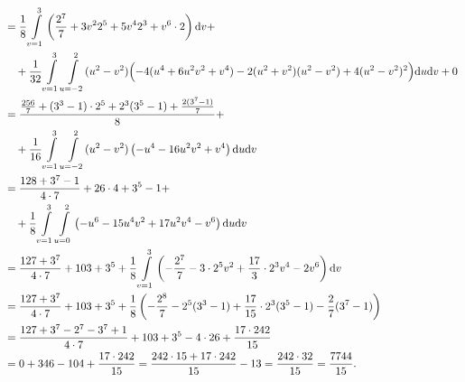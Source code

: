 {\begin{align*}
&=\frac 1{8}\int\limits_{v=1}^3\left( \frac{2^7}7+3v^22^5+5v^42^3+v^6\cdot 2\right)\mathrm{d} v + \\
&\quad + \frac 1{32}\int\limits_{v=1}^3\int\limits_{u=-2}^2
(u^2-v^2)\Bigl( 
-4(u^4+6u^2v^2+v^4)-2(u^2+v^2)(u^2-v^2)+4(u^2-v^2)^2\Bigr) \mathrm{d} u \mathrm{d} v + 0\\
&= \frac {\frac {256}7 + (3^3-1)\cdot 2^5 + 2^3(3^5-1)+\frac{2(3^7-1)}7}{8} + \\
&\quad + \frac 1{16}\int\limits_{v=1}^3\int\limits_{u=-2}^2(u^2-v^2)\left(
-u^4-16u^2v^2+v^4\right)\mathrm{d} u \mathrm{d} v\\
&= \frac{128+3^7-1}{4\cdot 7} + 26\cdot 4 + 3^5-1 + \\
&\quad +\frac 1{8}\int\limits_{v=1}^3\int\limits_{u=0}^2\left( -u^6-15u^4v^2+17u^2v^4-v^6\right)\mathrm{d}
u \mathrm{d} v\\
&= \frac{127+3^7}{4\cdot 7}+ 103+3^5 + \frac 1{8}\int\limits_{v=1}^3\left(
-\frac{2^7}7-3\cdot 2^5v^2 + \frac {17}3\cdot 2^3v^4-2v^6\right)\mathrm{d} v\\
&= \frac{127+3^7}{4\cdot 7}+ {103+3^5} + \frac 1{8}\left(
-\frac{2^8}7-2^5(3^3-1) + \frac {17}{15}\cdot 2^3(3^5-1)-\frac{2}7(3^7-1)\right)\\
&= \frac{127+3^7-2^7-3^7+1}{4\cdot 7}+{103+3^5} -4\cdot 26+\frac{17\cdot 242}{15}\\
&= 0 + {346} - 104 + \frac{17\cdot 242}{15}
= \frac{242\cdot 15+17\cdot 242}{15} - 13 = \frac{242\cdot 32}{15} 
= \frac{7744}{15}.
\end{align*}



}
